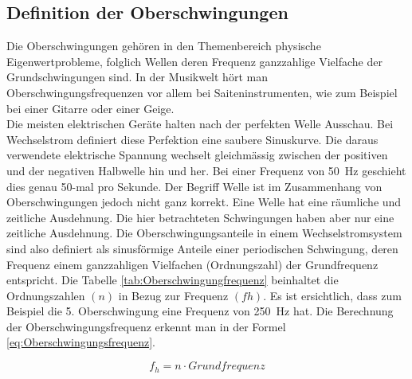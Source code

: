 \subsection{Definition der Oberschwingungen}
Die Oberschwingungen gehören in den Themenbereich \grqq\hspace{0.02cm} physische Eigenwertprobleme\grqq, folglich Wellen deren Frequenz ganzzahlige Vielfache der Grundschwingungen sind. In der Musikwelt hört man Oberschwingungsfrequenzen vor allem bei Saiteninstrumenten, wie zum Beispiel bei einer Gitarre oder einer Geige.\\
Die meisten elektrischen Geräte halten nach der perfekten Welle Ausschau. Bei Wechselstrom definiert diese Perfektion eine saubere Sinuskurve. Die daraus verwendete elektrische Spannung wechselt gleichmässig zwischen der positiven und der negativen Halbwelle hin und her. Bei einer Frequenz von \SI{50}{Hz} geschieht dies genau 50-mal pro Sekunde. Der Begriff Welle ist im Zusammenhang von Oberschwingungen jedoch nicht ganz korrekt. Eine Welle hat eine räumliche und zeitliche Ausdehnung. Die hier betrachteten Schwingungen haben aber nur eine zeitliche Ausdehnung. Die Oberschwingungsanteile in einem Wechselstromsystem sind also definiert als sinusförmige Anteile einer periodischen Schwingung, deren Frequenz einem ganzzahligen Vielfachen (Ordnungszahl) der Grundfrequenz entspricht. Die Tabelle \ref{tab:Oberschwingungfrequenz} beinhaltet die Ordnungszahlen $(n)$ in Bezug zur Frequenz $(fh)$. Es ist ersichtlich, dass zum Beispiel die 5. Oberschwingung eine Frequenz von \SI{250}{Hz} hat. Die Berechnung der Oberschwingungsfrequenz erkennt man in der Formel \ref{eq:Oberschwingungsfrequenz}.


\begin{equation}\label{eq:Oberschwingungsfrequenz}
f_h = n \cdot Grundfrequenz
\end{equation}

